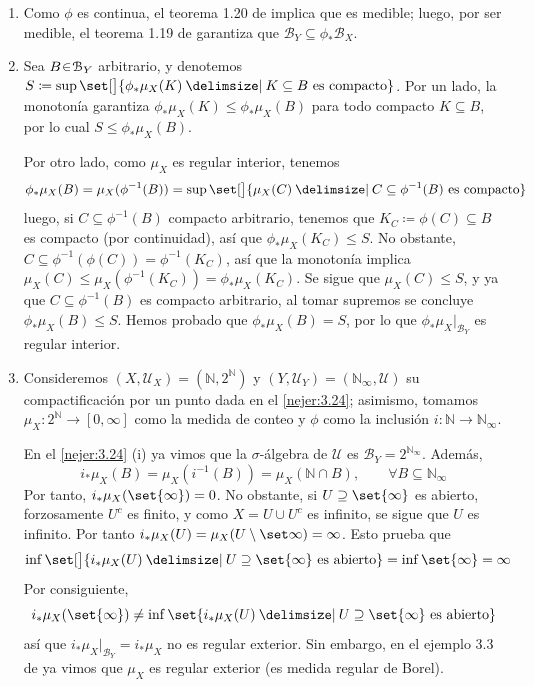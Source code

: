\begin{sol}
\begin{enumerate}[label = (\roman*), leftmargin=1.8em]
\item %
Como $\phi$ es continua, el teorema 1.20 de \cite[\S 1.2]{Salamon} implica que es medible; luego, por ser medible, el teorema 1.19 de \cite[\S 1.2]{Salamon} garantiza que $\mathcal{B}_Y \subseteq \phi_*\mathcal{B}_X$.
\item %
Sea $B \en \mathcal{B}_Y$ arbitrario, y denotemos $S \coloneq \sup\set[\big]{\phi_*\mu_X(K) \given K \subseteq B \text{ es compacto}}$. Por un lado, la monotonía garantiza $\phi_*\mu_X(K) \leq \phi_*\mu_X(B)$ para todo compacto $K \subseteq B$, por lo cual $S \leq \phi_*\mu_X(B)$.\par 
Por otro lado, como $\mu_X$ es regular interior, tenemos
\[
\phi_*\mu_X(B) = \mu_X(\phi^{-1}(B)) = \sup\set[\big]{\mu_X(C) \given C \subseteq \phi^{-1}(B) \text{ es compacto}}
\]
luego, si $C \subseteq \phi^{-1}(B)$ compacto arbitrario, tenemos que $K_C \coloneq \phi(C) \subseteq B$ es compacto (por continuidad), así que $\phi_*\mu_X(K_C) \le S$. No obstante, $ C \subseteq \phi^{-1}(\phi(C)) = \phi^{-1}(K_C)$, así que la monotonía implica $\mu_X(C) \le \mu_X(\phi^{-1}(K_C)) = \phi_*\mu_X(K_C)$. Se sigue que $\mu_X(C) \leq S$, y ya que $C \subseteq \phi^{-1}(B)$ es compacto arbitrario, al tomar supremos se concluye $\phi_*\mu_X(B) \le S$. Hemos probado que $\phi_*\mu_X(B) = S$, por lo que $\phi_*\mu_X|_{\mathcal{B}_Y}$ es regular interior.
\item %
Consideremos $(X,\mathcal{U}_X) = (\mathbb{N},2^\mathbb{N})$ y $(Y,\mathcal{U}_Y) = (\mathbb{N}_\infty, \mathcal{U})$ su compactificación por un punto dada en el \cref{nejer:3.24}; asimismo, tomamos $\mu_X\colon 2^\mathbb{N} \to [0,\infty]$ como la medida de conteo y $\phi$ como la inclusión $i \colon \mathbb{N} \to \mathbb{N}_\infty$.\par
En el \cref{nejer:3.24} (i) ya vimos que la $\sigma$-álgebra de $\mathcal{U}$ es $\mathcal{B}_Y = 2^{\mathbb{N}_\infty}$. Además, 
\[
i_*\mu_X(B) = \mu_X(i^{-1}(B)) = \mu_X(\mathbb{N} \cap B),
\qquad\forall B \subseteq \mathbb{N}_\infty
\]
Por tanto, $i_*\mu_X(\set{\infty}) = 0$. No obstante, si $U \supseteq \set{\infty}$ es abierto, forzosamente $U^c$ es finito, y como $X = U \cup U^c$ es infinito, se sigue que $U$ es infinito. Por tanto $i_*\mu_X(U) = \mu_X(U \setminus\set\infty) = \infty$. Esto prueba que
\[
\inf\set[\big]{i_*\mu_X(U) \given U \supseteq \set{\infty} \text{ es abierto}}
= \inf\set{\infty} = \infty
\]
Por consiguiente,
\[
i_*\mu_X(\set{\infty}) \neq \inf\set{i_*\mu_X(U) \given U \supseteq \set{\infty} \text{ es abierto}}
\]
así que $i_*\mu_X|_{\mathcal{B}_Y} = i_*\mu_X$ no es regular exterior. Sin embargo, en el ejemplo 3.3 de \cite[\S 3.1]{Salamon} ya vimos que $\mu_X$ es regular exterior (es medida regular de Borel).
\end{enumerate}
\end{sol}